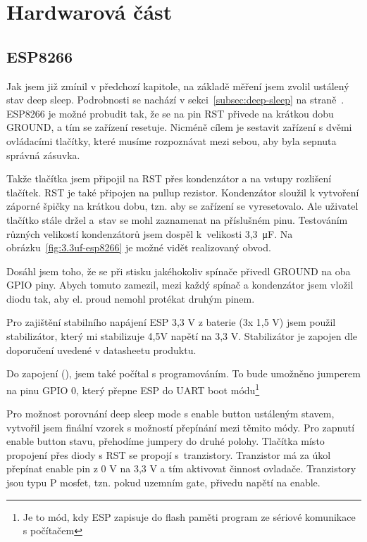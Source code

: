\documentclass[a4paper, 12pt]{report}
\begin{document}
    \section{Hardwarová část}
    \subsection{ESP8266}
    Jak jsem již zmínil v předchozí kapitole, na základě měření jsem zvolil ustálený stav deep sleep.
    Podrobnosti se nachází v sekci~\ref{subsec:deep-sleep} na straně~\pageref{subsec:deep-sleep}.
    ESP8266 je možné probudit tak, že se na pin RST přivede na krátkou dobu GROUND, a tím se zařízení resetuje.
    Nicméně cílem je sestavit zařízení s dvěmi ovládacími tlačítky, které musíme rozpoznávat mezi sebou, aby byla sepnuta správná zásuvka.\par
    Takže tlačítka jsem připojil na RST přes kondenzátor a na vstupy rozlišení tlačítek. RST je také připojen na pullup rezistor.
    Kondenzátor sloužil k vytvoření záporné špičky na krátkou dobu, tzn. aby se zařízení se vyresetovalo. Ale uživatel tlačítko stále držel a~stav se mohl zaznamenat na příslušném pinu.
    Testováním různých velikostí kondenzátorů jsem dospěl k~velikosti 3,3~\si{\micro F}. Na obrázku~\ref{fig:3.3uf-esp8266} je možné vidět realizovaný obvod.\par
    Dosáhl jsem toho, že se při stisku jakéhokoliv spínače přivedl GROUND na oba GPIO piny.
    Abych tomuto zamezil, mezi každý spínač a kondenzátor jsem vložil diodu tak, aby el. proud nemohl protékat druhým pinem. \par
    Pro zajištění stabilního napájení ESP 3,3 V z baterie (3x 1,5 V) jsem použil stabilizátor, který mi stabilizuje 4,5\si{V} napětí na 3,3 \si{V}.
    Stabilizátor je zapojen dle doporučení uvedené v datasheetu produktu.\par
    Do zapojení (), jsem také počítal s programováním. To bude umožněno jumperem na pinu GPIO 0, který přepne ESP do UART boot módu\footnote{Je to mód, kdy ESP zapisuje do flash paměti program ze sériové komunikace s počítačem} \par
    Pro možnost porovnání deep sleep mode s enable button ustáleným stavem, vytvořil jsem finální vzorek s možností přepínání mezi těmito módy.
    Pro zapnutí enable button stavu, přehodíme jumpery do druhé polohy.
    Tlačítka místo propojení přes diody s RST se propojí s~tranzistory.
    Tranzistor má za úkol přepínat enable pin z 0 V na 3,3 V a tím aktivovat činnost ovladače.
    Tranzistory jsou typu P mosfet, tzn. pokud uzemním gate, přivedu napětí na enable.
\end{document}
